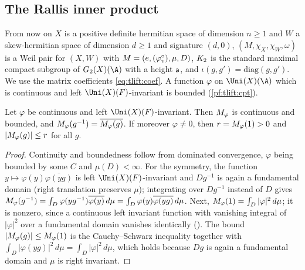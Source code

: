 \subsection{The Rallis inner product}\label{pf:tlift:rallis}

From now on $X$ is a positive definite hermitian space of dimension $n\ge1$ and $W$ a skew-hermitian
space of dimension $d\ge1$ and signature $(d,0)$, $(M,\chi_X,\chi_W,\omega)$ is a Weil pair for $(X,W)$ with
$M=(e,(\varphi^{\circ}_v),\mu,D)$, $K_2$ is the standard maximal compact subgroup of $G_2(X)(\A)$ with a height $\mathsf{a}$,
and $\iota(g,g')=\mathrm{diag}(g,g')$. We use the matrix coefficients \eqref{eq:tlift:coef}. A function $\varphi$
on $\Uni(X)(\A)$ which is continuous and left $\Uni(X)(F)$-invariant is bounded (\cref{pf:tlift:cpt}).

\begin{lemma}\label{pf:tlift:mc}
Let $\varphi$ be continuous and left $\Uni(X)(F)$-invariant. Then $M_\varphi$ is continuous and bounded, and
$M_\varphi(g^{-1})=\overline{M_\varphi(g)}$. If moreover $\varphi\ne0$, then $r=M_\varphi(1)>0$ and
$|M_\varphi(g)|\le r$ for all $g$.
\end{lemma}

\begin{proof}
Continuity and boundedness follow from dominated convergence, $\varphi$ being bounded by some $C$ and
$\mu(D)<\infty$. For the symmetry, the function $y\mapsto\varphi(y)\overline{\varphi(yg)}$ is left $\Uni(X)(F)$-invariant
and $Dg^{-1}$ is again a fundamental domain (right translation preserves $\mu$); integrating over $Dg^{-1}$
instead of $D$ gives $M_\varphi(g^{-1})=\int_D\varphi(yg^{-1})\overline{\varphi(y)}\,d\mu=\int_D\varphi(y)\overline{\varphi(yg)}\,d\mu$.
Next, $M_\varphi(1)=\int_D|\varphi|^2\,d\mu$; it is nonzero, since a continuous left invariant function with
vanishing integral of $|\varphi|^2$ over a fundamental domain vanishes identically
(). The bound $|M_\varphi(g)|\le M_\varphi(1)$ is the Cauchy--Schwarz
inequality together with $\int_D|\varphi(yg)|^2\,d\mu=\int_D|\varphi|^2\,d\mu$, which holds because $Dg$ is again a
fundamental domain and $\mu$ is right invariant.
\end{proof}

